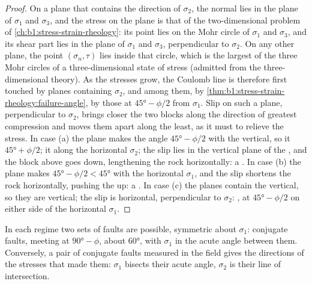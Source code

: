 \begin{proof}
On a plane that contains the direction of $\sigma_2$, the normal lies in the
plane of $\sigma_1$ and $\sigma_3$, and the stress on the plane is that of the
two-dimensional problem of \cref{ch:b1:stress-strain-rheology}: its point
lies on the Mohr circle of $\sigma_1$ and $\sigma_3$, and its shear part lies
in the plane of $\sigma_1$ and $\sigma_3$, perpendicular to $\sigma_2$. On any
other plane, the point $(\sigma_n, \tau)$ lies inside that circle, which is
the largest of the three Mohr circles of a three-dimensional state of stress
(admitted from the three-dimensional theory). As the stresses grow, the Coulomb
line is therefore first touched by planes containing $\sigma_2$, and among
them, by \cref{thm:b1:stress-strain-rheology:failure-angle}, by those at
$\ang{45} - \phi/2$ from $\sigma_1$. Slip on such a plane, perpendicular to
$\sigma_2$, brings closer the two blocks along the direction of greatest
compression and moves them apart along the least, as it must to relieve the
stress. In case (a) the plane makes the angle $\ang{45} - \phi/2$ with the
vertical, so it  $\ang{45} + \phi/2$; it  along the horizontal
$\sigma_2$; the slip lies in the vertical plane of the , and the block above
goes down, lengthening the rock horizontally: a . In case (b) the
plane makes $\ang{45} - \phi/2 < \ang{45}$ with the horizontal $\sigma_1$, and
the slip shortens the rock horizontally, pushing the  up: a
. In case (c) the planes contain the vertical, so they are
vertical; the slip is horizontal, perpendicular to $\sigma_2$: , at $\ang{45} - \phi/2$ on either side of the horizontal $\sigma_1$.
\end{proof}

In each regime two sets of faults are possible, symmetric about $\sigma_1$:
conjugate faults, meeting at $\ang{90} - \phi$, about \ang{60}, with
$\sigma_1$ in the acute angle between them. Conversely, a pair of conjugate
faults measured in the field gives the directions of the stresses that made
them: $\sigma_1$ bisects their acute angle, $\sigma_2$ is their line of
intersection.

